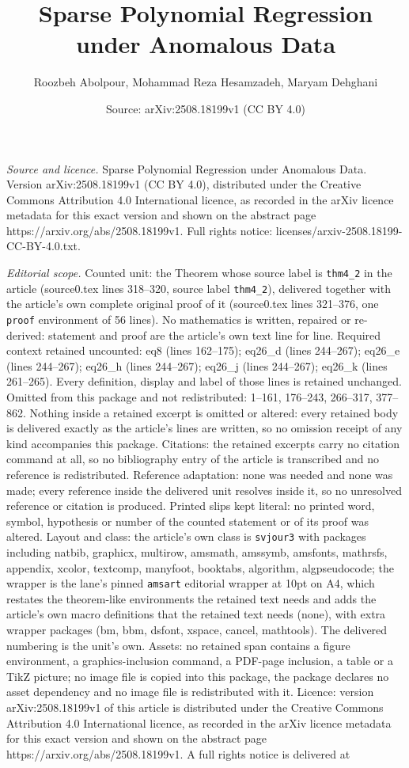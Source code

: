\documentclass[10pt,a4paper]{amsart}
\title[Sparse Polynomial Regression under Anomalous Data]{Sparse Polynomial Regression under Anomalous Data}
\author{Roozbeh Abolpour, Mohammad Reza Hesamzadeh, Maryam Dehghani}
\date{Source: arXiv:2508.18199v1 (CC BY 4.0)}
\begin{document}
\maketitle

\noindent\emph{Source and licence.} Sparse Polynomial Regression under Anomalous Data. Version arXiv:2508.18199v1 (CC BY 4.0), distributed under the Creative Commons Attribution 4.0 International licence, as recorded in the arXiv licence metadata for this exact version and shown on the abstract page https://arxiv.org/abs/2508.18199v1. Full rights notice: licenses/arxiv-2508.18199-CC-BY-4.0.txt.\par\smallskip

\noindent\textit{Editorial scope.} Counted unit: the Theorem whose source label is \texttt{thm4\_2} in the article (source0.tex lines 318--320, source label \texttt{thm4\_2}), delivered together with the article's own complete original proof of it (source0.tex lines 321--376, one \texttt{proof} environment of 56 lines). No mathematics is written, repaired or re-derived: statement and proof are the article's own text line for line. Required context retained uncounted: eq8 (lines 162--175); eq26\_d (lines 244--267); eq26\_e (lines 244--267); eq26\_h (lines 244--267); eq26\_j (lines 244--267); eq26\_k (lines 261--265). Every definition, display and label of those lines is retained unchanged. Omitted from this package and not redistributed: 1--161, 176--243, 266--317, 377--862. Nothing inside a retained excerpt is omitted or altered: every retained body is delivered exactly as the article's lines are written, so no omission receipt of any kind accompanies this package. Citations: the retained excerpts carry no citation command at all, so no bibliography entry of the article is transcribed and no reference is redistributed. Reference adaptation: none was needed and none was made; every reference inside the delivered unit resolves inside it, so no unresolved reference or citation is produced. Printed slips kept literal: no printed word, symbol, hypothesis or number of the counted statement or of its proof was altered. Layout and class: the article's own class is \texttt{svjour3} with packages including natbib, graphicx, multirow, amsmath, amssymb, amsfonts, mathrsfs, appendix, xcolor, textcomp, manyfoot, booktabs, algorithm, algpseudocode; the wrapper is the lane's pinned \texttt{amsart} editorial wrapper at 10pt on A4, which restates the theorem-like environments the retained text needs and adds the article's own macro definitions that the retained text needs (none), with extra wrapper packages (bm, bbm, dsfont, xspace, cancel, mathtools). The delivered numbering is the unit's own. Assets: no retained span contains a figure environment, a graphics-inclusion command, a PDF-page inclusion, a table or a TikZ picture; no image file is copied into this package, the package declares no asset dependency and no image file is redistributed with it. Licence: version arXiv:2508.18199v1 of this article is distributed under the Creative Commons Attribution 4.0 International licence, as recorded in the arXiv licence metadata for this exact version and shown on the abstract page https://arxiv.org/abs/2508.18199v1. A full rights notice is delivered at 
\end{document}
